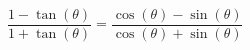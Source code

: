 {$\dfrac{1 - \tan(\theta)}{1+ \tan(\theta)} = \dfrac{\cos(\theta) - \sin(\theta)}{\cos(\theta) + \sin(\theta)}$}
{}
